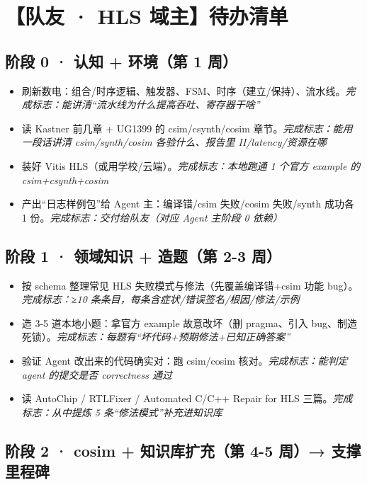 \documentclass[12pt,a4paper]{ctexbook}
\begin{document}
\section{【队友 · HLS 域主】待办清单}

\subsection*{阶段 0 · 认知 + 环境（第 1 周）}

\begin{itemize}
\item[☐] 刷新数电：组合/时序逻辑、触发器、FSM、时序（建立/保持）、流水线。\hfill {\small\textit{完成标志：能讲清“流水线为什么提高吞吐、寄存器干啥”}}
\item[☐] 读 Kastner 前几章 + UG1399 的 csim/csynth/cosim 章节。\hfill {\small\textit{完成标志：能用一段话讲清 csim/synth/cosim 各验什么、报告里 II/latency/资源在哪}}
\item[☐] 装好 Vitis HLS（或用学校/云端）。\hfill {\small\textit{完成标志：本地跑通 1 个官方 example 的 csim+csynth+cosim}}
\item[☐] 产出“日志样例包”给 Agent 主：编译错/csim 失败/cosim 失败/synth 成功各 1 份。\hfill {\small\textit{完成标志：交付给队友（对应 Agent 主阶段 0 依赖）}}
\end{itemize}

\subsection*{阶段 1 · 领域知识 + 造题（第 2-3 周）}

\begin{itemize}
\item[☐] 按 schema 整理常见 HLS 失败模式与修法（先覆盖编译错+csim 功能 bug）。\hfill {\small\textit{完成标志：≥10 条条目，每条含症状/错误签名/根因/修法/示例}}
\item[☐] 造 3-5 道本地小题：拿官方 example 故意改坏（删 pragma、引入 bug、制造死锁）。\hfill {\small\textit{完成标志：每题有“坏代码+预期修法+已知正确答案”}}
\item[☐] 验证 Agent 改出来的代码确实对：跑 csim/cosim 核对。\hfill {\small\textit{完成标志：能判定 agent 的提交是否 correctness 通过}}
\item[☐] 读 AutoChip / RTLFixer / Automated C/C++ Repair for HLS 三篇。\hfill {\small\textit{完成标志：从中提炼 5 条“修法模式”补充进知识库}}
\end{itemize}

\subsection*{阶段 2 · cosim + 知识库扩充（第 4-5 周）→ 支撑里程碑}
\end{document}
